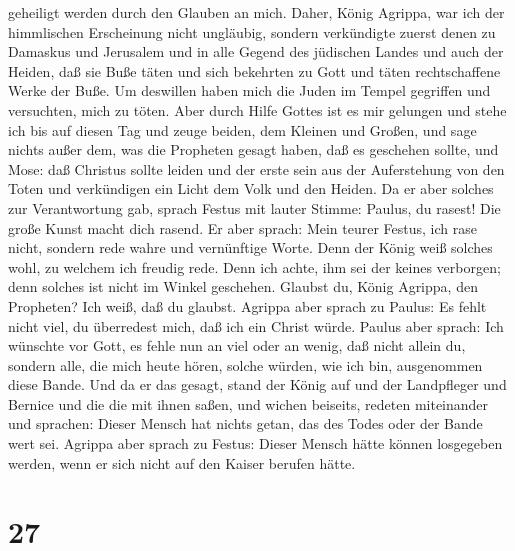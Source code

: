 geheiligt werden durch den Glauben an mich.  Daher, König
Agrippa, war ich der himmlischen Erscheinung nicht ungläubig,
 sondern verkündigte zuerst denen zu Damaskus und Jerusalem
und in alle Gegend des jüdischen Landes und auch der Heiden, daß sie
Buße täten und sich bekehrten zu Gott und täten rechtschaffene Werke der
Buße.  Um deswillen haben mich die Juden im Tempel
gegriffen und versuchten, mich zu töten.  Aber durch Hilfe
Gottes ist es mir gelungen und stehe ich bis auf diesen Tag und zeuge
beiden, dem Kleinen und Großen, und sage nichts außer dem, was die
Propheten gesagt haben, daß es geschehen sollte, und Mose: 
daß Christus sollte leiden und der erste sein aus der Auferstehung von
den Toten und verkündigen ein Licht dem Volk und den Heiden.
 Da er aber solches zur Verantwortung gab, sprach Festus
mit lauter Stimme: Paulus, du rasest! Die große Kunst macht dich rasend.
 Er aber sprach: Mein teurer Festus, ich rase nicht,
sondern rede wahre und vernünftige Worte.  Denn der König
weiß solches wohl, zu welchem ich freudig rede. Denn ich achte, ihm sei
der keines verborgen; denn solches ist nicht im Winkel geschehen.
 Glaubst du, König Agrippa, den Propheten? Ich weiß, daß du
glaubst.  Agrippa aber sprach zu Paulus: Es fehlt nicht
viel, du überredest mich, daß ich ein Christ würde.  Paulus
aber sprach: Ich wünschte vor Gott, es fehle nun an viel oder an wenig,
daß nicht allein du, sondern alle, die mich heute hören, solche würden,
wie ich bin, ausgenommen diese Bande.  Und da er das
gesagt, stand der König auf und der Landpfleger und Bernice und die die
mit ihnen saßen,  und wichen beiseits, redeten miteinander
und sprachen: Dieser Mensch hat nichts getan, das des Todes oder der
Bande wert sei.  Agrippa aber sprach zu Festus: Dieser
Mensch hätte können losgegeben werden, wenn er sich nicht auf den Kaiser
berufen hätte.

\hypertarget{section-26}{%
\section{27}\label{section-26}}

